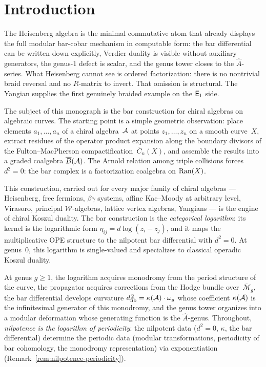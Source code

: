 \chapter{Introduction}\label{ch:heisenberg-frame}


The Heisenberg algebra is the minimal commutative atom that already
displays the full modular bar-cobar mechanism in computable form: the
bar differential can be written down explicitly, Verdier duality is
visible without auxiliary generators, the genus-$1$ defect is scalar,
and the genus tower closes to the $\hat{A}$-series.  What Heisenberg
cannot see is ordered factorization: there is no nontrivial braid
reversal and no $R$-matrix to invert.  That omission is structural.
The Yangian supplies the first genuinely braided example on the
$\mathsf{E}_1$ side.

The subject of this monograph is the bar construction for chiral
algebras on algebraic curves.  The starting point is a simple geometric
observation: place elements $a_1, \ldots, a_n$ of a chiral
algebra~$\mathcal{A}$ at points $z_1, \ldots, z_n$ on a smooth curve~$X$,
extract residues of the operator product expansion along the boundary
divisors of the Fulton--MacPherson compactification~$\overline{C}_n(X)$,
and assemble the results into a graded coalgebra $\overline{B}(\mathcal{A})$.  The
Arnold relation among triple collisions forces $d^2 = 0$: the bar
complex is a factorization coalgebra on $\operatorname{Ran}(X)$.

This construction, carried out for every major family of chiral algebras
--- Heisenberg, free fermions, $\beta\gamma$ systems, affine Kac--Moody
at arbitrary level, Virasoro, principal $\mathcal{W}$-algebras,
lattice vertex algebras, Yangians --- is the engine of chiral Koszul
duality.  The bar construction is the \emph{categorical logarithm}: its
kernel is the logarithmic form $\eta_{ij} = d\log(z_i - z_j)$, and it
maps the multiplicative OPE structure to the nilpotent bar differential
with $d^2 = 0$.  At genus~$0$, this logarithm is single-valued and
specializes to classical operadic Koszul duality.

At genus $g \geq 1$,
the logarithm acquires monodromy from the period structure of the curve,
the propagator acquires corrections from the Hodge bundle
over~$\overline{\mathcal{M}}_g$, the bar differential develops curvature
$d_{\mathrm{fib}}^{\,2} = \kappa(\mathcal{A})\cdot\omega_g$ whose coefficient
$\kappa(\mathcal{A})$ is the infinitesimal generator of this monodromy, and the
genus tower organizes into a modular deformation whose generating
function is the $\hat{A}$-genus.  Throughout, \emph{nilpotence is the
logarithm of periodicity}: the nilpotent data ($d^2 = 0$, $\kappa$, the
bar differential) determine the periodic data (modular transformations,
periodicity of bar cohomology, the monodromy representation) via
exponentiation (Remark~\ref{rem:nilpotence-periodicity}).

